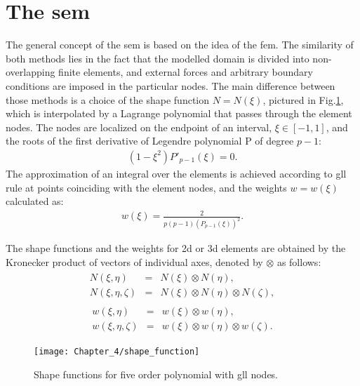 \section{The \acs{sem}}
\label{sec:sem}


The general concept of the \ac{sem} is based on the idea of the \ac{fem}.
The similarity of both methods lies in the fact that the modelled domain is divided into non-overlapping finite elements, and external forces and arbitrary boundary conditions are imposed in the particular nodes.
The main difference between those methods is a choice of the shape function \( N=N(\xi )\), pictured in Fig.\ref{fig:shape}, which is interpolated by a Lagrange polynomial that passes through the element nodes.
The nodes are localized on the endpoint of an interval, \(\xi\in[-1,1]\), and the roots of the first derivative of Legendre polynomial P of degree \(p-1\):
\begin{eqnarray}
	(1-\xi^2)P'_{p-1}(\xi)=0.
	\label{eq:nodes}
\end{eqnarray}
The approximation of an integral over the elements is achieved according to \ac{gll} rule at points coinciding with the element nodes, 
and the weights \(w=w(\xi)\) calculated as:
\begin{eqnarray}
	{w(\xi)} = \frac{2}{p(p-1)(P_{p-1}(\xi))^2}.
	\label{eq:weight}
\end{eqnarray}

The shape functions and the weights for \ac{2d} or \ac{3d} elements are obtained by the Kronecker product of vectors of individual axes, denoted by \(\otimes\) as follows:
\begin{eqnarray}
	\begin{array}{rcl}
	N(\xi,\eta) & = & N(\xi)\otimes N(\eta),\\
	N(\xi,\eta,\zeta) & = & N(\xi)\otimes N(\eta)\otimes N(\zeta),
	\end{array}
\label{eq:shape_functions}
\end{eqnarray}
\begin{eqnarray}
	\begin{array}{rcl}
	w(\xi,\eta) & = & w(\xi)\otimes w(\eta),\\
	w(\xi,\eta,\zeta) & = & w(\xi)\otimes w(\eta)\otimes w(\zeta).
	\end{array}
	\label{eq:weights}
\end{eqnarray}
\begin{figure}[H]
	\begin{center}
		\texttt{[image: Chapter\_4/shape\_function]}
	\end{center}
	\caption{Shape functions for five order polynomial with \acf{gll} nodes.}
	\label{fig:shape}
\end{figure}

